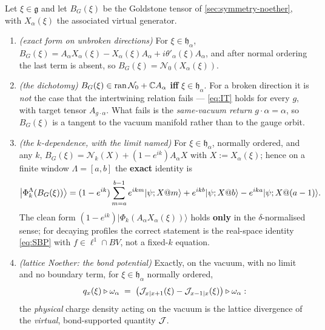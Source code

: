 \begin{theorem}
\label{thm:g0}
\statusProved\;
Let $\xi\in\mathfrak{g}$ and let $B_G(\xi)$ be the Goldstone tensor of
\cref{sec:symmetry-noether}, with $X_\alpha(\xi)$ the associated virtual
generator.
\begin{enumerate}
\item[(a)] \emph{(exact form on unbroken directions)} For $\xi\in\mathfrak{h}_\alpha$,
  $B_G(\xi)=A_\alpha X_\alpha(\xi)-X_\alpha(\xi)A_\alpha+i\theta'_\alpha(\xi)A_\alpha$,
  and after normal ordering the last term is absent, so
  $B_G(\xi)=\mathcal{N}_0(X_\alpha(\xi))$.
\item[(b)] \emph{(the dichotomy)}
  $B_G(\xi)\in\operatorname{ran}\mathcal{N}_0+\mathbb{C} A_\alpha$ \textbf{iff}
  $\xi\in\mathfrak{h}_\alpha$.  For a broken direction it is \emph{not} the case
  that the intertwining relation fails --- \cref{eq:IT} holds for every $g$, with
  target tensor $A_{g\cdot\alpha}$.  What fails is the \emph{same-vacuum return}
  $g\cdot\alpha=\alpha$, so $B_G(\xi)$ is a tangent to the vacuum manifold rather
  than to the gauge orbit.
\item[(c)] \emph{(the $k$-dependence, with the limit named)} For
  $\xi\in\mathfrak{h}_\alpha$, normally ordered, and any $k$,
  $B_G(\xi)=\mathcal{N}_k(X)+(1-e^{ik})A_\alpha X$ with $X:=X_\alpha(\xi)$; hence
  on a finite window $\Lambda=[a,b]$ the \textbf{exact} identity is
  \begin{equation}
    \bigl|\Phi^\Lambda_k(B_G(\xi))\bigr\rangle
    = (1-e^{ik})\sum_{m=a}^{b-1}e^{ikm}|\psi;X@m\rangle
      + e^{ikb}|\psi;X@b\rangle - e^{ika}|\psi;X@(a-1)\rangle .
    \label{eq:G0c}
  \end{equation}
  The clean form $(1-e^{ik})\bigl|\Phi_k(A_\alpha X_\alpha(\xi))\bigr\rangle$
  holds \textbf{only} in the $\delta$-normalised sense; for decaying profiles the
  correct statement is the real-space identity \cref{eq:SBP} with
  $f\in\ell^1\cap BV$, not a fixed-$k$ equation.
\item[(d)] \emph{(lattice Noether: the bond potential)} Exactly, on the vacuum,
  with no limit and no boundary term, for $\xi\in\mathfrak{h}_\alpha$ normally
  ordered,
  \begin{equation}
    q_x(\xi)\triangleright\omega_\alpha
    \;=\;\bigl(\mathcal{J}_{x|x+1}(\xi)-\mathcal{J}_{x-1|x}(\xi)\bigr)\triangleright\omega_\alpha:
    \label{eq:G0d}
  \end{equation}
  the \emph{physical} charge density acting on the vacuum is the lattice
  divergence of the \emph{virtual}, bond-supported quantity $\mathcal{J}$.

\end{enumerate}
\end{theorem}
